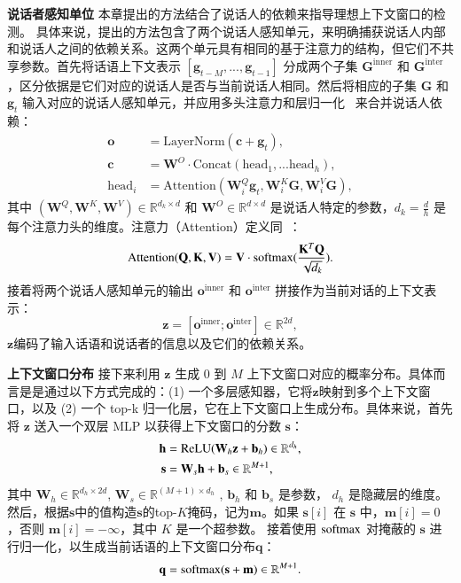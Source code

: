 \noindent\textbf{说话者感知单位 } 本章提出的方法结合了说话人的依赖来指导理想上下文窗口的检测。
具体来说，提出的方法包含了两个说话人感知单元，来明确捕获说话人内部和说话人之间的依赖关系。这两个单元具有相同的基于注意力的结构，但它们不共享参数。首先将话语上下文表示 $\left[\mathbf{g}_{t-M}, ...,\mathbf{g}_{t-1}\right]$ 分成两个子集 $\mathbf{G}^\textrm{inner}$ 和 $\mathbf{G}^\textrm{inter}$，区分依据是它们对应的说话人是否与当前说话人相同。然后将相应的子集 $\mathbf{G}$ 和 $\mathbf{g}_t$ 输入对应的说话人感知单元，并应用多头注意力和层归一化~\cite{vaswani2017attention} 来合并说话人依赖：
\begin{align}
    \mathbf{o}&=\textrm{LayerNorm}(\mathbf{c} + \mathbf{g}_t), \nonumber \\
    \mathbf{c}&=\mathbf{W}^O \cdot \textrm{Concat}(\textrm{head}_1,...\textrm{head}_h), \nonumber \\
    \textrm{head}_i&=\textrm{Attention}(\mathbf{W}^Q_i\mathbf{g}_t, \mathbf{W}^K_i\mathbf{G}, \mathbf{W}^V_i\mathbf{G}), \nonumber
\end{align}
其中 $(\mathbf{W}^Q, \mathbf{W}^K, \mathbf{W}^V) \in \mathbb{R}^{d_k \times d}$ 和 $\mathbf{W}^ O \in \mathbb{R}^{d\times d}$ 是说话人特定的参数，$d_k = \frac{d}{h}$ 是每个注意力头的维度。注意力（Attention）定义同~\citet{vaswani2017attention}：
\begin{equation}
\textrm{Attention}(\mathbf{Q, K, V})=\mathbf{V} \cdot \operatorname*{softmax}(\frac{\mathbf{K}^T\mathbf{Q}}{\sqrt{d_k}}). \nonumber
\end{equation}
接着将两个说话人感知单元的输出 $\mathbf{o}^\textrm{inner}$ 和 $\mathbf{o}^\textrm{inter}$ 拼接作为当前对话的上下文表示：
\begin{equation}\label{eq:z}
    \mathbf{z} = [\mathbf{o}^\textrm{inner};\mathbf{o}^\textrm{inter}] \in \mathbb{R}^{2d},
\end{equation}
$\mathbf{z}$编码了输入话语和说话者的信息以及它们的依赖关系。

\noindent\textbf{上下文窗口分布 } 接下来利用 $\mathbf{z}$ 生成 0 到 $M$ 上下文窗口对应的概率分布。具体而言是是通过以下方式完成的：(1) 一个多层感知器，它将$\mathbf{z}$映射到多个上下文窗口，以及 (2) 一个 top-k 归一化层，它在上下文窗口上生成分布。具体来说，首先将 $\mathbf{z}$ 送入一个双层 MLP 以获得上下文窗口的分数 $\mathbf{s}$：
\begin{align}
    \mathbf{h} &= \operatorname*{ReLU}(\mathbf{W}_h\mathbf{z} + \mathbf{b}_h) \in \mathbb{R}^{d_h}, \nonumber \\
    \mathbf{s} &= \mathbf{W}_s\mathbf{h} + \mathbf{b}_s \in \mathbb{R}^{M+1}, \nonumber
\end{align}
其中 $\mathbf{W}_h \in \mathbb{R}^{d_h \times 2d}$, $\mathbf{W}_s \in \mathbb{R}^{(M+1) \times d_h}$ , $\mathbf{b}_h$ 和 $\mathbf{b}_s$ 是参数， $d_h$ 是隐藏层的维度。然后，根据$\mathbf{s}$中的值构造$\mathbf{s}$的top-$K$掩码，记为$\mathbf{m}$。如果 $\mathbf{s}[i]$ 在 $\mathbf{s}$ 中，$\mathbf{m}[i] = 0$ ，否则 $\mathbf{m}[i] = -\infty$，其中 $K$ 是一个超参数。 接着使用 $\operatorname*{softmax}$ 对掩蔽的 $\mathbf{s}$ 进行归一化，以生成当前话语的上下文窗口分布$\mathbf{q}$：
\begin{equation}\label{eq:q}
    \mathbf{q} = \operatorname*{softmax}(\mathbf{s} + \mathbf{m}) \in \mathbb{R}^{M+1}.
\end{equation}


